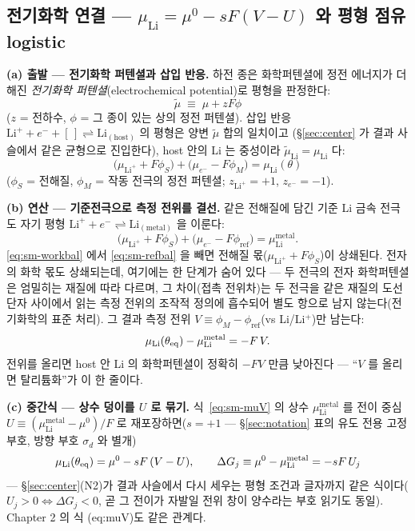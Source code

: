 \subsection{전기화학 연결 --- $\mu_\mathrm{Li}=\mu^0-sF(V-U)$ 와 평형 점유 logistic}\label{sec:sm-electro}
\textbf{(a) 출발 --- 전기화학 퍼텐셜과 삽입 반응.} 하전 종은 화학퍼텐셜에 정전 에너지가 더해진
\emph{전기화학 퍼텐셜}(electrochemical potential)로 평형을 판정한다:
\begin{equation}
\tilde\mu\;\equiv\;\mu+zF\phi
\label{eq:sm-emu}
\end{equation}
($z$ = 전하수, $\phi$ = 그 종이 있는 상의 정전 퍼텐셜). 삽입 반응
$\mathrm{Li}^++e^-+[\,]\rightleftharpoons\mathrm{Li}_{(\mathrm{host})}$ 의 평형은 양변 $\tilde\mu$ 합의 일치이고
(\S\ref{sec:center} 가 결과 사슬에서 같은 균형으로 진입한다), host 안의 Li 는 중성이라
$\tilde\mu_\mathrm{Li}=\mu_\mathrm{Li}$ 다:
\begin{equation}
\big(\mu_{\mathrm{Li}^+}+F\phi_S\big)+\big(\mu_{e^-}-F\phi_M\big)=\mu_\mathrm{Li}(\theta)
\label{eq:sm-workbal}
\end{equation}
($\phi_S$ = 전해질, $\phi_M$ = 작동 전극의 정전 퍼텐셜; $z_{\mathrm{Li}^+}{=}+1$, $z_{e^-}{=}-1$).

\textbf{(b) 연산 --- 기준전극으로 측정 전위를 결선.} 같은 전해질에 담긴 기준 Li 금속 전극도 자기 평형
$\mathrm{Li}^++e^-\rightleftharpoons\mathrm{Li}_{(\mathrm{metal})}$ 을 이룬다:
\begin{equation}
\big(\mu_{\mathrm{Li}^+}+F\phi_S\big)+\big(\mu_{e^-}-F\phi_\mathrm{ref}\big)=\mu_\mathrm{Li}^\mathrm{metal}.
\label{eq:sm-refbal}
\end{equation}
\eqref{eq:sm-workbal} 에서 \eqref{eq:sm-refbal} 을 빼면 전해질 몫($\mu_{\mathrm{Li}^+}+F\phi_S$)이
상쇄된다. 전자의 화학 몫도 상쇄되는데, 여기에는 한 단계가 숨어 있다 --- 두 전극의 전자 화학퍼텐셜은
엄밀히는 재질에 따라 다르며, 그 차이(접촉 전위차)는 두 전극을 같은 재질의 도선 단자 사이에서 읽는 측정
전위의 조작적 정의에 흡수되어 별도 항으로 남지 않는다(전기화학의 표준 처리). 그 결과 측정 전위
$V\equiv\phi_M-\phi_\mathrm{ref}$(vs Li/Li$^+$)만 남는다:
\begin{equation}
\mu_\mathrm{Li}(\theta_{\mathrm{eq}})-\mu_\mathrm{Li}^\mathrm{metal}=-F\,V.
\label{eq:sm-muV}
\end{equation}
전위를 올리면 host 안 Li 의 화학퍼텐셜이 정확히 $-FV$ 만큼 낮아진다 --- ``$V$ 를 올리면 탈리튬화''가 이 한 줄이다.

\textbf{(c) 중간식 --- 상수 덩이를 $U$ 로 묶기.} 식~\eqref{eq:sm-muV} 의 상수 $\mu_\mathrm{Li}^\mathrm{metal}$
를 전이 중심 $U\equiv(\mu_\mathrm{Li}^\mathrm{metal}-\mu^0)/F$ 로 재포장하면($s=+1$ --- \S\ref{sec:notation}
표의 유도 전용 고정 부호, 방향 부호 $\sigma_d$ 와 별개)
\begin{equation}
\mu_\mathrm{Li}(\theta_{\mathrm{eq}})=\mu^0-sF\,(V-U),
\qquad
\Delta G_j\equiv\mu^0-\mu_\mathrm{Li}^\mathrm{metal}=-sF\,U_j
\label{eq:sm-eqcond}
\end{equation}
--- \S\ref{sec:center}(N2)가 결과 사슬에서 다시 세우는 평형 조건과 글자까지 같은 식이다($U_j>0
\Leftrightarrow\Delta G_j<0$, 곧 그 전이가 자발일 전위 창이 양수라는 부호 읽기도 동일). Chapter 2 의 식
(eq:muV)도 같은 관계다.

